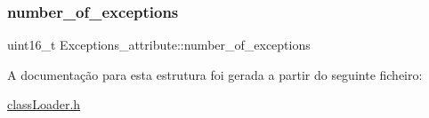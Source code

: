 \hypertarget{struct_exceptions__attribute_a407848f89bd4b856a9edb6bc358f4b0d}{}\label{struct_exceptions__attribute_a407848f89bd4b856a9edb6bc358f4b0d} 
\subsubsection{\texorpdfstring{number\+\_\+of\+\_\+exceptions}{number\_of\_exceptions}}
{\footnotesize\ttfamily uint16\+\_\+t Exceptions\+\_\+attribute\+::number\+\_\+of\+\_\+exceptions}



A documentação para esta estrutura foi gerada a partir do seguinte ficheiro\+:\begin{DoxyCompactItemize}
\item 
\hyperlink{class_loader_8h}{class\+Loader.\+h}\end{DoxyCompactItemize}
